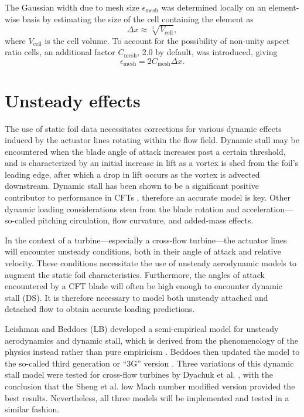 The Gaussian width due to mesh size $\epsilon_{\mathrm{mesh}}$ was determined
locally on an element-wise basis by estimating the size of the cell containing
the element as
\begin{equation}
    \Delta x \approx \sqrt[3]{V_\mathrm{cell}},
\end{equation}
where $V_\mathrm{cell}$ is the cell volume. To account for the possibility of non-unity aspect ratio cells, an additional factor $C_\mathrm{mesh}$, 2.0 by default, was introduced, giving
\begin{equation}
    \epsilon_{\mathrm{mesh}} = 2C_\mathrm{mesh} \Delta x.
\end{equation}


\section{Unsteady effects}


The use of static foil data necessitates corrections for various dynamic effects
induced by the actuator lines rotating within the flow field. Dynamic stall may
be encountered when the blade angle of attack increases past a certain
threshold, and is characterized by an initial increase in lift as a vortex is
shed from the foil's leading edge, after which a drop in lift occurs as the
vortex is advected downstream. Dynamic stall has been shown to be a significant
positive contributor to performance in CFTs \cite{Para2002, Urbina2013},
therefore an accurate model is key. Other dynamic loading considerations stem
from the blade rotation and acceleration---so-called pitching circulation, flow
curvature, and added-mass effects.

In the context of a turbine---especially a cross-flow turbine---the actuator
lines will encounter unsteady conditions, both in their angle of attack and
relative velocity. These conditions necessitate the use of unsteady aerodynamic
models to augment the static foil characteristics. Furthermore, the angles of
attack encountered by a CFT blade will often be high enough to encounter dynamic
stall (DS). It is therefore necessary to model both unsteady attached and
detached flow to obtain accurate loading predictions.


Leishman and Beddoes (LB) developed a semi-empirical model for unsteady
aerodynamics and dynamic stall, which is derived from the phenomenology of the
physics instead rather than pure empiricism \cite{Leishman1989}. Beddoes then
updated the model to the so-called third generation or ``3G'' version
\cite{Beddoes1993}. Three variations of this dynamic stall model were tested for
cross-flow turbines by Dyachuk et al. \cite{Dyachuk2014}, with the conclusion
that the Sheng et al. low Mach number modified version \cite{Sheng2008} provided
the best results. Nevertheless, all three models will be implemented and tested
in a similar fashion.

